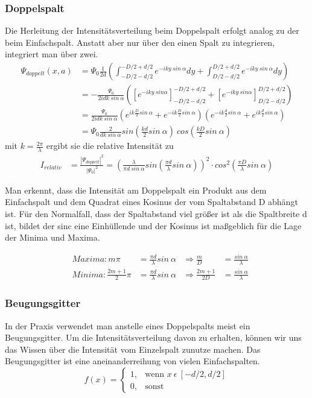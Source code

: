 \documentclass[]{article}
\begin{document}
\subsubsection{Doppelspalt}
Die Herleitung der Intensitätsverteilung beim Doppelspalt erfolgt analog zu der beim Einfachspalt. Anstatt aber nur über den einen Spalt zu integrieren, integriert man über zwei. 
\begin{align}
	\Psi_{doppelt}(x,a)&=\Psi_{0}\frac{1}{2d}(\int_{-D/2-d/2}^{-D/2+d/2}e^{-iky \: sin \: \alpha}dy+\int_{D/2-d/2}^{D/2+d/2}e^{-iky \: sin \: \alpha}dy)\\
%
	&=-\frac{\Psi_{0}}{2idk \: sin \: \alpha}([e^{-iky \: sin \alpha}]_{-D/2-d/2}^{-D/2+d/2}+[e^{-iky \: sin \alpha}]_{D/2-d/2}^{D/2+d/2})\\
%
	&=\frac{\Psi_{0}}{2idk \: sin \: \alpha}(e^{ik\frac{D}{2} sin \: \alpha}+ e^{-ik\frac{D}{2} sin \: \alpha})(e^{-ik\frac{d}{2} sin \: \alpha}+ e^{ik\frac{d}{2} sin \: \alpha})\\
	&=\Psi_{0}\frac{2}{dk \: sin \: \alpha}sin (\frac{kd}{2} sin \: \alpha)\: cos(\frac{kD}{2}sin \: \alpha)
\end{align}
mit $k=\frac{2 \pi}{\lambda}$ ergibt sie die relative Intensität zu
\begin{align}
	I_{relativ}&=	\frac{|\Psi_{doppelt}|^2}{|\Psi_{0}|^2}=\left( \frac{\lambda}{\pi d \: sin \: \alpha}sin \left(  \frac{\pi d}{\lambda} sin \: \alpha \right)\right)^2 \cdot cos^2 \left( \frac{\pi D}{\lambda}sin \: \alpha \right) 
\end{align}


Man erkennt, dass die Intensität am Doppelspalt ein Produkt aus dem Einfachspalt und dem Quadrat eines Kosinus der vom Spaltabstand D abhängt ist. Für den Normalfall, dass der Spaltabstand viel größer ist als die Spaltbreite d ist, bildet der sinc eine Einhüllende und der Kosinus ist maßgeblich für die Lage der Minima und Maxima.

\begin{align}
	&Maxima: m\pi&=\frac{\pi d}{\lambda}sin \: \alpha &\Rightarrow \frac{m}{D}&= \frac {sin \: \alpha}{\lambda } \\
	&Minima: \frac{2m+1}{2}\pi&=\frac{\pi d}{\lambda}sin \: \alpha &\Rightarrow \frac{2m+1}{2D}&=\frac{sin \: \alpha}{\lambda}	
\end{align}


\subsubsection{Beugungsgitter}
In der Praxis verwendet man anstelle eines Doppelspalts meist ein Beugungsgitter. Um die Intensitätsverteilung davon zu erhalten, können wir uns das Wissen über die Intensität vom Einzelspalt zunutze machen. Das Beugungsgitter ist eine aneinanderreihung von vielen Einfachspalten. 
\begin{equation}
f(x)=\begin{cases}
1,  & \text{wenn  }x \ \epsilon \: [-d/2,d/2]\\
0, & \text{sonst }
\end{cases}
\end{equation}
\end{document}
